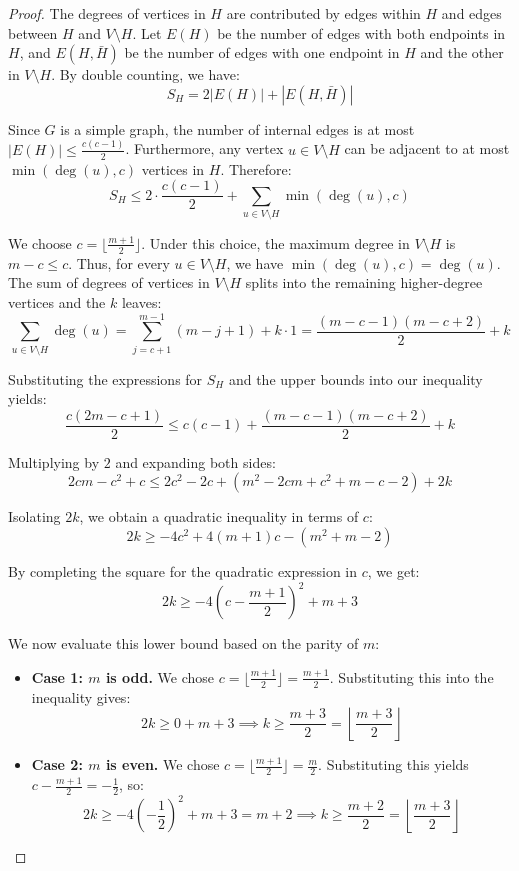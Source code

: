 \documentclass[11pt, a4paper]{ctexrep}
\begin{document}
\begin{proof}
    The degrees of vertices in $H$ are contributed by edges within $H$ and edges between $H$ and $V \setminus H$. Let $E(H)$ be the number of edges with both endpoints in $H$, and $E(H, \bar{H})$ be the number of edges with one endpoint in $H$ and the other in $V \setminus H$. By double counting, we have:
    \[
        S_H = 2|E(H)| + |E(H, \bar{H})|
    \]

    Since $G$ is a simple graph, the number of internal edges is at most $|E(H)| \leq \frac{c(c-1)}{2}$. Furthermore, any vertex $u \in V \setminus H$ can be adjacent to at most $\min(\deg(u), c)$ vertices in $H$. Therefore:
    \[
        S_H \leq 2 \cdot \frac{c(c-1)}{2} + \sum_{u \in V \setminus H} \min(\deg(u), c)
    \]

    We choose $c = \lfloor \frac{m+1}{2} \rfloor$. Under this choice, the maximum degree in $V \setminus H$ is $m-c \leq c$. Thus, for every $u \in V \setminus H$, we have $\min(\deg(u), c) = \deg(u)$. The sum of degrees of vertices in $V \setminus H$ splits into the remaining higher-degree vertices and the $k$ leaves:
    \[
        \sum_{u \in V \setminus H} \deg(u) = \sum_{j=c+1}^{m-1} (m-j+1) + k \cdot 1 = \frac{(m-c-1)(m-c+2)}{2} + k
    \]

    Substituting the expressions for $S_H$ and the upper bounds into our inequality yields:
    \[
        \frac{c(2m - c + 1)}{2} \leq c(c-1) + \frac{(m-c-1)(m-c+2)}{2} + k
    \]

    Multiplying by $2$ and expanding both sides:
    \[
        2cm - c^2 + c \leq 2c^2 - 2c + (m^2 - 2cm + c^2 + m - c - 2) + 2k
    \]

    Isolating $2k$, we obtain a quadratic inequality in terms of $c$:
    \[
        2k \geq -4c^2 + 4(m+1)c - (m^2 + m - 2)
    \]

    By completing the square for the quadratic expression in $c$, we get:
    \[
        2k \geq -4\left(c - \frac{m+1}{2}\right)^2 + m + 3
    \]

    We now evaluate this lower bound based on the parity of $m$:
    \begin{itemize}
        \item \textbf{Case 1: $m$ is odd.} We chose $c = \lfloor \frac{m+1}{2} \rfloor = \frac{m+1}{2}$. Substituting this into the inequality gives:
              \[
                  2k \geq 0 + m + 3 \implies k \geq \frac{m+3}{2} = \left\lfloor \frac{m+3}{2} \right\rfloor
              \]

        \item \textbf{Case 2: $m$ is even.} We chose $c = \lfloor \frac{m+1}{2} \rfloor = \frac{m}{2}$. Substituting this yields $c - \frac{m+1}{2} = -\frac{1}{2}$, so:
              \[
                  2k \geq -4\left(-\frac{1}{2}\right)^2 + m + 3 = m + 2 \implies k \geq \frac{m+2}{2} = \left\lfloor \frac{m+3}{2} \right\rfloor
              \]
    \end{itemize}


\end{proof}
\end{document}
